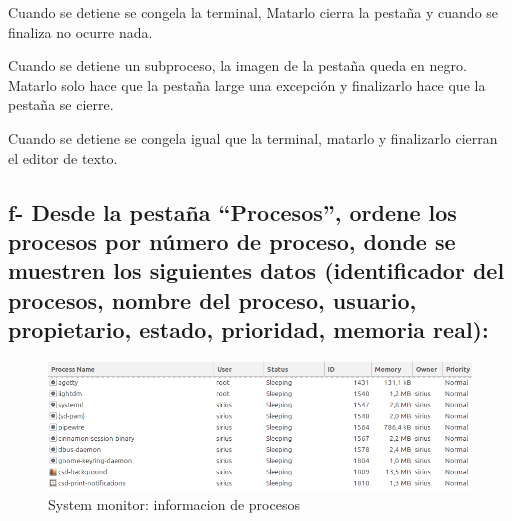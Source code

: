 \documentclass{article}
\begin{document}
 \begin{info}[Bash]
    Cuando se detiene se congela la terminal, Matarlo cierra la pestaña y cuando se finaliza no ocurre nada.
 \end{info}
\begin{info}[Brave]
    Cuando se detiene un subproceso, la imagen de la pestaña queda en negro. Matarlo solo hace que la pestaña large una excepción
    y finalizarlo hace que la pestaña se cierre.
 \end{info}
 \begin{info}[Xed]
    Cuando se detiene se congela igual que la terminal, matarlo y finalizarlo cierran el editor de texto.
 \end{info}


\subsection*{f- Desde la pestaña “Procesos”, ordene los procesos por número de proceso, donde se muestren los
siguientes datos (identificador del procesos, nombre del proceso, usuario, propietario, estado,
prioridad, memoria real):}

\begin{figure}[h]
  \centering
  \includegraphics[width=1\textwidth]{resources/ej2f.png}
  \caption{System monitor: informacion de procesos}
\end{figure}
\end{document}
